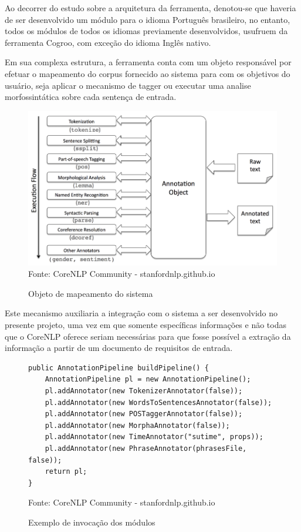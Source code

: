 Ao decorrer do estudo sobre a arquitetura da ferramenta, denotou-se que haveria de ser desenvolvido um módulo para o idioma Português brasileiro, no entanto, todos os módulos de todos os idiomas previamente desenvolvidos, usufruem da ferramenta Cogroo, com exceção do idioma Inglês nativo.

Em sua complexa estrutura, a ferramenta conta com um objeto responsável por efetuar o mapeamento do corpus fornecido ao sistema para com os objetivos do usuário, seja aplicar o mecanismo de tagger ou executar uma analise morfossintática sobre cada sentença de entrada.

\begin{figure}[H]
\centering
\caption{Objeto de mapeamento do sistema} %
\includegraphics[scale=0.4]{AnnotationPipeline}\\  %
{\small Fonte: CoreNLP Community - stanfordnlp.github.io} %
\label{fig:exemplo} %
\end{figure}

Este mecanismo auxiliaria a integração com o sistema a ser desenvolvido no presente projeto, uma vez em que somente específicas informações e não todas que o CoreNLP oferece seriam necessárias para que fosse possível a extração da informação a partir de um documento de requisitos de entrada.

\begin{figure}[H]
\centering
\caption{Exemplo de invocação dos módulos} %
\begin{lstlisting}
public AnnotationPipeline buildPipeline() {
    AnnotationPipeline pl = new AnnotationPipeline();
    pl.addAnnotator(new TokenizerAnnotator(false));
    pl.addAnnotator(new WordsToSentencesAnnotator(false));
    pl.addAnnotator(new POSTaggerAnnotator(false));
    pl.addAnnotator(new MorphaAnnotator(false));
    pl.addAnnotator(new TimeAnnotator("sutime", props));
    pl.addAnnotator(new PhraseAnnotator(phrasesFile, false));
    return pl;
}
\end{lstlisting} 
{\small Fonte: CoreNLP Community - stanfordnlp.github.io} %
\label{fig:exemplocodigo1} %
\end{figure}


